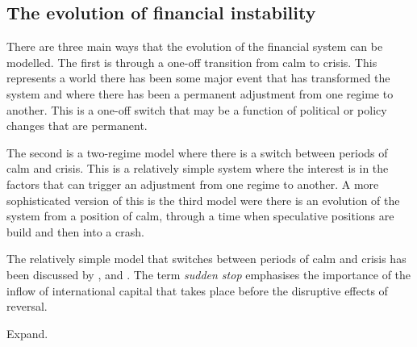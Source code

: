 \documentclass[12pt, a4paper, oneside]{article} %
\begin{document}

\subsection{The evolution of financial instability}
There are three main ways that the evolution of the financial system can be modelled.  The first is through a one-off transition from calm to crisis. This represents a world there has been some major event that has transformed the system and where there has been a permanent adjustment from one regime to another.  This is a one-off switch that may be a function of political or policy changes that are permanent.  

The second is a two-regime model where there is a switch between periods of calm and crisis.  This is  a relatively simple system where the interest is in the factors that can trigger an adjustment from one regime to another.  A more sophisticated version of this is the third model were there is an evolution of the system from a position of calm, through a time when speculative positions are build and then into a crash. 

The relatively simple model that switches between periods of calm and crisis has been discussed by \citet{DornbuschSS}, \citet{CalvoSS} and \citet{KrugmanSS}.  The term \emph{sudden stop} emphasises the importance of the inflow of international capital that takes place before the disruptive effects of reversal.  

Expand.

\end{document}
